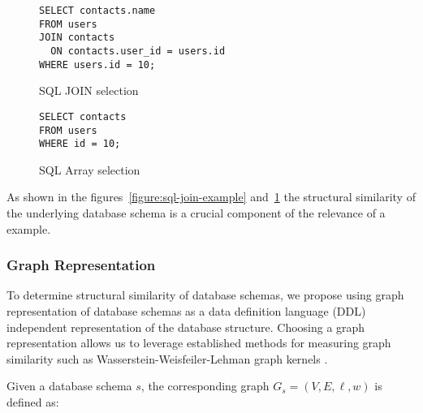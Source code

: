\begin{figure}[ht]
  \vspace{1em}
  \hfill
  \begin{minipage}[b]{0.45\linewidth}
    \begin{verbatim}
SELECT contacts.name
FROM users
JOIN contacts
  ON contacts.user_id = users.id
WHERE users.id = 10;
    \end{verbatim}
    \caption{SQL JOIN selection}
    \label{figure:sql-join-example}
  \end{minipage}
  \hfill
  \begin{minipage}[b]{0.35\linewidth}
    \centering
    \begin{verbatim}
SELECT contacts
FROM users
WHERE id = 10;
    \end{verbatim}
    \vspace{1.3em}
    \caption{SQL Array selection}
    \label{figure:sql-array-example}
  \end{minipage}
  \hfill
  \vspace{1em}
\end{figure}


As shown in the figures~\ref{figure:sql-join-example} and~\ref{figure:sql-array-example}
the structural similarity of the underlying database schema is a crucial component
of the relevance of a example.

\subsubsection{Graph Representation}

To determine structural similarity of database schemas, we propose using
graph representation of database schemas as a data definition language (DDL)
independent representation of the database structure. Choosing a graph
representation allows us to leverage established methods for measuring graph similarity
such as Wasserstein-Weisfeiler-Lehman graph kernels \cite{WWL}. %

Given a database schema $s$, the corresponding graph $G_s = (V, E, \ell, w)$ is defined as:

